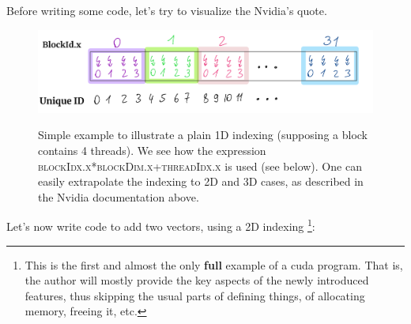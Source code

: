 Before writing some code, let's try to visualize the Nvidia's quote.
\begin{figure}[H]
   \centering
   \includegraphics[scale=0.25]{pngs/tindexing.png}
   \label{tindexing}
   \caption{Simple example to illustrate a plain 1D indexing (supposing a block 
   contains 4 threads). We see how the expression \textsc{blockIdx.x*blockDim.x+threadIdx.x} is used (see below). 
   One can easily extrapolate the indexing to 2D and 3D cases, as described in the Nvidia documentation above.
   }
\end{figure}
Let's now write code to add two vectors, using a 2D indexing \footnote{This is the first and almost the only \textbf{full} example of a cuda program. 
That is, the author will mostly provide the key aspects of the newly introduced features, thus skipping the usual parts of defining things, of allocating 
memory, freeing it, etc.}: 

